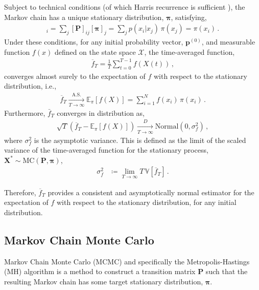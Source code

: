 \documentclass{article}
\begin{document}
Subject to technical conditions (of which Harris recurrence is sufficient \cite{brooks2011handbook}), the Markov chain has a unique stationary distribution, $\bm{\pi}$, satisfying,
\begin{align}
    [\bm{\pi}]_i = \sum_{j} [\mathbf{P}]_{i j} [\bm{\pi}]_j =  \sum_{j} p(x_i | x_j) \, \pi(x_j) = \pi(x_i) \,.
\end{align}
Under these conditions, for any initial probability vector, $\mathbf{p}^{(0)}$, and measurable function $f(x)$ defined on the state space $\mathcal{X}$, the time-averaged function,
\begin{align}
    \overline{f}_T = \frac{1}{T} \sum_{t=0}^{T-1} f(X(t)) \,,
\end{align}
converges almost surely to the expectation of $f$ with respect to the stationary distribution, i.e.,
\begin{align}
    \overline{f}_T \xrightarrow[T \to \infty]{\text{A.S.}} \mathbb{E}_{\pi}[f(X)] = \sum_{i=1}^{N} f(x_i) \, \pi(x_i) \,.
\end{align}
Furthermore, $\bar{f}_T$ converges in distribution as,
\begin{align}
    \sqrt{T} \left( \overline{f}_T - \mathbb{E}_{\pi}[f(X)] \right) \xrightarrow[T \to \infty]{D} \text{Normal}(0, \sigma_f^2) \,,
\end{align}
where $\sigma_f^2$ is the asymptotic variance. This is defined as the limit of the scaled variance of the time-averaged function for
the stationary process, $\bm{X}^{*} \sim \text{MC}(\mathbf{P}, \bm{\pi})$,
\begin{align}
    \sigma_f^2 & \coloneqq \lim_{T \to \infty} T \, \mathbb{V}[\overline{f}_T] \,.
\end{align}

Therefore, $\overline{f}_T$ provides a consistent and asymptotically normal estimator for the expectation of $f$ with respect to the stationary distribution, for
any initial distribution.

\subsection{Markov Chain Monte Carlo}

Markov Chain Monte Carlo (MCMC) and specifically the Metropolis-Hastings (MH) algorithm is a method to construct a transition matrix $\mathbf{P}$ such that the resulting Markov chain has some target stationary distribution, $\bm{\pi}$.
\end{document}
